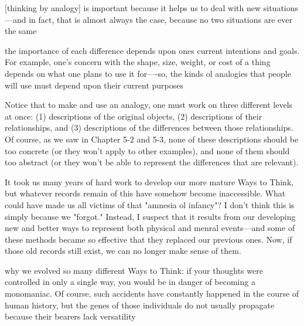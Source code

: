 \documentclass[10pt,a4paper]{article}
\begin{document}
[thinking by analogy] is important because it helps us to deal with new situations—and in fact, that is almost always the case, because no two situations are ever the same \cite[p.~205]{minsky}

the importance of each difference depends upon ones current intentions and goals. For example, one's concern with the shape, size, weight, or cost of a thing depends on what one plans to use it for—-so, the kinds ol analogies that people will use must depend upon their current purposes \cite[p.~207]{minsky}

Notice that to make and use an analogy, one must work on three different levels at once: (1) descriptions of the original objects, (2) descriptions of their relationships, and (3) descriptions of the differences between those relationships. Of course, as we saw in Chapter 5-2 and 5-3, none of these descriptions should be too concrete (or they won't apply to other examples), and none of them should too abstract (or they won't be able to represent the differences that are relevant). \cite[p.~209]{minsky}

It took us many years of hard work to develop our more mature Ways to Think, but whatever records remain of this have somehow become inaccessible. What could have made us all victims of that "amnesia ol infancy"? I don't think this is simply because we "forgot." Instead, I suspect that it results from our developing new and better ways to represent both physical and menral events—and some of these methods became so effective that they replaced our previous ones. Now, if those old records still exist, we can no longer make sense of them. \cite[p.~216]{minsky}

why we evolved so many different Ways to Think: if your thoughts were controlled in only a single way, you would be in danger of becoming a monomaniac. Of course, such accidents have constantly happened in the course of human history, but the genes of those individuals do not usually propagate because their bearers lack versatility \cite[p.~217]{minsky}
\end{document}
